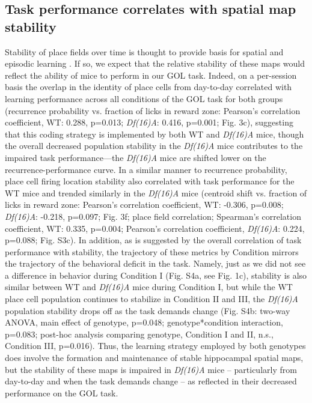 \subsection{Task performance correlates with spatial map stability}

Stability of place fields over time is thought to provide basis for spatial and episodic learning \citep{Kentros2004}\citep{Mankin2012}\citep{Thompson1990}\citep{Ziv2013}. If so, we expect that the relative stability of these maps would reflect the ability of mice to perform in our GOL task. Indeed, on a per-session basis the overlap in the identity of place cells from day-to-day correlated with learning performance across all conditions of the GOL task for both groups (recurrence probability vs. fraction of licks in reward zone: Pearson’s correlation coefficient, WT: 0.288, p=0.013; \emph{Df(16)A\super{+/-}}: 0.416, p=0.001; Fig. 3c), suggesting that this coding strategy is implemented by both WT and \emph{Df(16)A\super{+/-}} mice, though the overall decreased population stability in the \emph{Df(16)A\super{+/-}} mice contributes to the impaired task performance—the \emph{Df(16)A\super{+/-}}  mice are shifted lower on the recurrence-performance curve. In a similar manner to recurrence probability, place cell firing location stability also correlated with task performance for the WT mice and trended similarly in the \emph{Df(16)A\super{+/-}} mice (centroid shift vs. fraction of licks in reward zone: Pearson’s correlation coefficient, WT: -0.306, p=0.008; \emph{Df(16)A\super{+/-}}: -0.218, p=0.097; Fig. 3f; place field correlation; Spearman’s correlation coefficient, WT: 0.335, p=0.004; Pearson’s correlation coefficient, \emph{Df(16)A\super{+/-}}: 0.224, p=0.088; Fig. S3c). In addition, as is suggested by the overall correlation of task performance with stability, the trajectory of these metrics by Condition mirrors the trajectory of the behavioral deficit in the task. Namely, just as we did not see a difference in behavior during Condition I (Fig. S4a, see Fig. 1c), stability is also similar between WT and \emph{Df(16)A\super{+/-}}  mice during Condition I, but while the WT place cell population continues to stabilize in Condition II and III, the \emph{Df(16)A\super{+/-}} population stability drops off as the task demands change (Fig. S4b: two-way ANOVA, main effect of genotype, p=0.048; genotype*condition interaction, p=0.083; post-hoc analysis comparing genotype, Condition I and II, n.s., Condition III, p=0.016). Thus, the learning strategy employed by both genotypes does involve the formation and maintenance of stable hippocampal spatial maps, but the stability of these maps is impaired in \emph{Df(16)A\super{+/-}} mice – particularly from day-to-day and when the task demands change – as reflected in their decreased performance on the GOL task.

